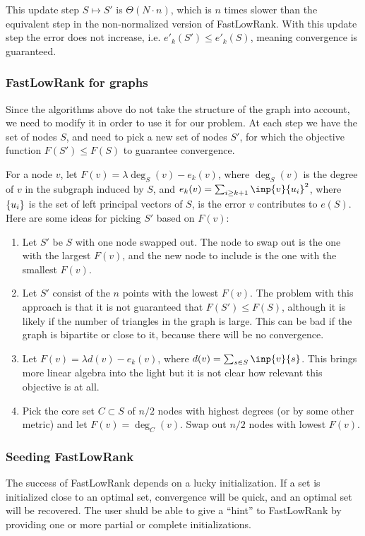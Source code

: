 \documentclass{article}
\begin{document}
  This update step $S \mapsto S'$ is $\Theta(N\cdot n)$, which is $n$ times slower than the equivalent step in the non-normalized version of FastLowRank. With this update step the error does not increase, i.e. $e'_k(S') \leq e'_k(S)$, meaning convergence is guaranteed.

\subsubsection{FastLowRank for graphs}
Since the algorithms above do not take the structure of the graph into account, we need to modify it in order to use it for our problem. At each step we have the set of nodes $S$, and need to pick a new set of nodes $S'$, for which the objective function $F(S') \leq F(S)$ to guarantee convergence.

For a node $v$, let $F(v) = \lambda \deg_S(v) - e_k(v)$, where $\deg_S(v)$ is the degree of $v$ in the subgraph induced by $S$, and $e_k(v) = \sum_{i\geq k+1}\inp{v}{u_i}^2$, where $\left\{u_i\right\}$ is the set of left principal vectors of $S$, is the error $v$ contributes to $e(S)$. Here are some ideas for picking $S'$ based on $F(v)$:

\begin{enumerate}
    \item Let $S'$ be $S$ with one node swapped out. The node to swap out is the one with the largest $F(v)$, and the new node to include is the one with the smallest $F(v)$.
    \item Let $S'$ consist of the $n$ points with the lowest $F(v)$. The problem with this approach is that it is not guaranteed that $F(S') \leq F(S)$, although it is likely if the number of triangles in the graph is large. This can be bad if the graph is bipartite or close to it, because there will be no convergence.
    \item Let $F(v) = \lambda d(v) - e_k(v)$, where $d(v) = \sum_{s\in S}\inp{v}{s}$. This brings more linear algebra into the light but it is not clear how relevant this objective is at all.
    \item Pick the core set $C \subset S$ of $n/2$ nodes with highest degrees (or by some other metric) and let $F(v) = \deg_C(v)$. Swap out $n/2$ nodes with lowest $F(v)$.
\end{enumerate}

\subsubsection{Seeding FastLowRank}
The success of FastLowRank depends on a lucky initialization. If a set is initialized close to an optimal set, convergence will be quick, and an optimal set will be recovered. The user shuld be able to give a ``hint'' to FastLowRank by providing one or more partial or complete initializations.
\end{document}
